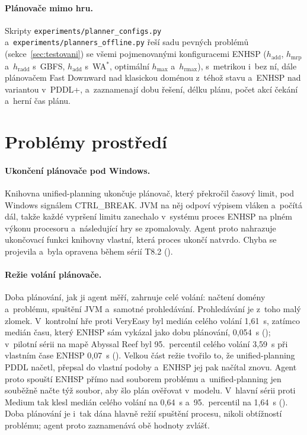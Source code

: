 \paragraph{Plánovače mimo hru.} Skripty \nolinkurl{experiments/planner_configs.py} a~\nolinkurl{experiments/planners_offline.py} řeší sadu pevných problémů (sekce~\ref{sec:testovani}) se všemi pojmenovanými konfiguracemi ENHSP ($h_{\mathrm{add}}$, $h_{\mathrm{mrp}}$ a~$h_{\mathrm{radd}}$ s~GBFS, $h_{\mathrm{add}}$ s~WA$^*$, optimální $h_{\max}$ a~$h_{\mathrm{rmax}}$), s~metrikou i~bez ní, dále plánovačem Fast Downward nad klasickou doménou z~téhož stavu a~ENHSP nad variantou v~PDDL+, a~zaznamenají dobu řešení, délku plánu, počet akcí čekání a~herní čas plánu.

\section{Problémy prostředí}
\label{sec:prostredi}

\paragraph{Ukončení plánovače pod Windows.} Knihovna unified-planning ukončuje plánovač, který překročil časový limit, pod Windows signálem CTRL\_BREAK. JVM na něj odpoví výpisem vláken a~počítá dál, takže každé vypršení limitu zanechalo v~systému proces ENHSP na plném výkonu procesoru a~následující hry se zpomalovaly. Agent proto nahrazuje ukončovací funkci knihovny vlastní, která proces ukončí natvrdo. Chyba se projevila a~byla opravena během sérií T8.2 ().

\paragraph{Režie volání plánovače.} Doba plánování, jak ji agent měří, zahrnuje celé volání: načtení domény a~problému, spuštění JVM a~samotné prohledávání. Prohledávání je z~toho malý zlomek. V~kontrolní hře proti VeryEasy byl medián celého volání 1,61~s, zatímco medián času, který ENHSP sám vykázal jako dobu plánování, 0,054~s (); v~pilotní sérii na mapě Abyssal Reef byl 95.~percentil celého volání 3,59~s při vlastním čase ENHSP 0,07~s (). Velkou část režie tvořilo to, že unified-planning PDDL načetl, přepsal do vlastní podoby a~ENHSP jej pak načítal znovu. Agent proto spouští ENHSP přímo nad souborem problému a~unified-planning jen souběžně načte týž soubor, aby šlo plán ověřovat v~modelu. V~hlavní sérii proti Medium tak klesl medián celého volání na 0,64~s a~95.~percentil na 1,64~s (). Doba plánování je i~tak dána hlavně režií spuštění procesu, nikoli obtížností problému; agent proto zaznamenává obě hodnoty zvlášť.

